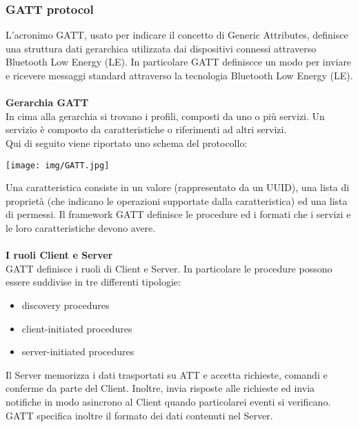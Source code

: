 \documentclass{article}
\begin{document}
\subsubsection{GATT protocol}
L'acronimo GATT, usato per indicare il concetto di Generic Attributes, definisce una struttura dati gerarchica utilizzata dai dispositivi connessi attraverso Bluetooth Low Energy (LE).
In particolare GATT definiscce un modo per inviare e ricevere messaggi standard attraverso la tecnologia Bluetooth Low Energy (LE).\\\\
\textbf{Gerarchia GATT}\\
In cima alla gerarchia si trovano i profili, composti da uno o più servizi.
Un servizio è composto da caratteristiche o riferimenti ad altri servizi. 
\\Qui di seguito viene riportato uno schema del protocollo:
\begin{center}
\texttt{[image: img/GATT.jpg]}    
\end{center}
Una caratteristica consiste in un valore (rappresentato da un UUID), una lista di proprietà (che indicano le operazioni supportate dalla caratteristica) ed una lista di permessi. 
Il framework GATT definisce le procedure ed i formati che i servizi e le loro caratteristiche devono avere. \\ \\
\textbf{I ruoli Client e Server}\\
GATT definisce i ruoli di Client e Server. In particolare le procedure possono essere suddivise in tre differenti tipologie:
\begin{itemize}
    \item discovery procedures
    \item client-initiated procedures
    \item server-initiated procedures
\end{itemize}
Il Server memorizza i dati trasportati su ATT e accetta richieste, comandi e conferme da parte del Client. Inoltre, invia risposte alle richieste ed invia notifiche in modo asincrono al Client quando particolarei eventi si verificano.\\
GATT specifica inoltre il formato dei dati contenuti nel Server.
\end{document}
